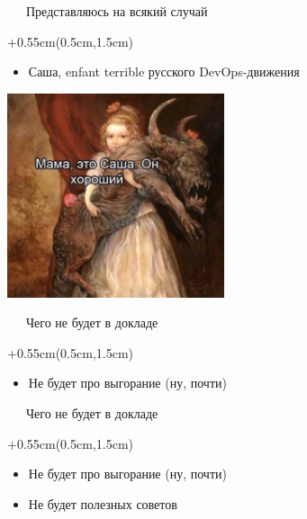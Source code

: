 \documentclass[xetex,18pt,aspectratio=169]{beamer}
\begin{document}
\begin{Large}


\begin{frame}{\ \ \ Представляюсь на всякий случай}
\begin{textblock*}{\framewidth+0.55cm}(0.5cm,1.5cm)
\begin{itemize}
  \item Саша, enfant terrible русского DevOps-движения
\end{itemize}
\begin{minipage}{\textwidth}
  \centering
  \includegraphics[height=6.0cm]{img/sasha}
\end{minipage}
\end{textblock*}
\end{frame}
  
\begin{frame}{\ \ \ Чего не будет в докладе}
\begin{textblock*}{\framewidth+0.55cm}(0.5cm,1.5cm)
\begin{itemize}
  \item Не будет про выгорание (ну, почти)
\end{itemize}
\end{textblock*}
\end{frame}

\begin{frame}{\ \ \ Чего не будет в докладе}
\begin{textblock*}{\framewidth+0.55cm}(0.5cm,1.5cm)
\begin{itemize}
  \item Не будет про выгорание (ну, почти)
  \item Не будет полезных советов
\end{itemize}
\end{textblock*}
\end{frame}


\end{Large}
\end{document}
